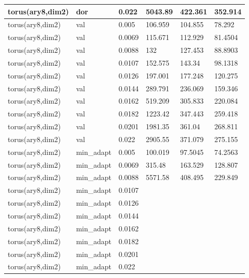 \begin{longtable}[H]{llllll}
torus(ary8,dim2) & dor        & 0.022                          & 5043.89 & 422.361 & 352.914 \\ \hline
torus(ary8,dim2) & val        & 0.005                          & 106.959 & 104.855 & 78.292  \\
torus(ary8,dim2) & val        & 0.0069                         & 115.671 & 112.929 & 81.4504 \\
torus(ary8,dim2) & val        & 0.0088                         & 132     & 127.453 & 88.8903 \\
torus(ary8,dim2) & val        & 0.0107                         & 152.575 & 143.34  & 98.1318 \\
torus(ary8,dim2) & val        & 0.0126                         & 197.001 & 177.248 & 120.275 \\
torus(ary8,dim2) & val        & 0.0144                         & 289.791 & 236.069 & 159.346 \\
torus(ary8,dim2) & val        & 0.0162                         & 519.209 & 305.833 & 220.084 \\
torus(ary8,dim2) & val        & 0.0182                         & 1223.42 & 347.443 & 259.418 \\
torus(ary8,dim2) & val        & 0.0201                         & 1981.35 & 361.04  & 268.811 \\
torus(ary8,dim2) & val        & 0.022                          & 2905.55 & 371.079 & 275.155 \\ \hline
torus(ary8,dim2) & min\_adapt & 0.005                          & 100.019 & 97.5045 & 74.2563 \\
torus(ary8,dim2) & min\_adapt & 0.0069                         & 315.48  & 163.529 & 128.807 \\
torus(ary8,dim2) & min\_adapt & 0.0088                         & 5571.58 & 408.495 & 229.849 \\
torus(ary8,dim2) & min\_adapt & 0.0107                         &         &         &         \\
torus(ary8,dim2) & min\_adapt & 0.0126                         &         &         &         \\
torus(ary8,dim2) & min\_adapt & 0.0144                         &         &         &         \\
torus(ary8,dim2) & min\_adapt & 0.0162                         &         &         &         \\
torus(ary8,dim2) & min\_adapt & 0.0182                         &         &         &         \\
torus(ary8,dim2) & min\_adapt & 0.0201                         &         &         &         \\
torus(ary8,dim2) & min\_adapt & 0.022                          &         &         &         \\ \hline
\end{longtable}


